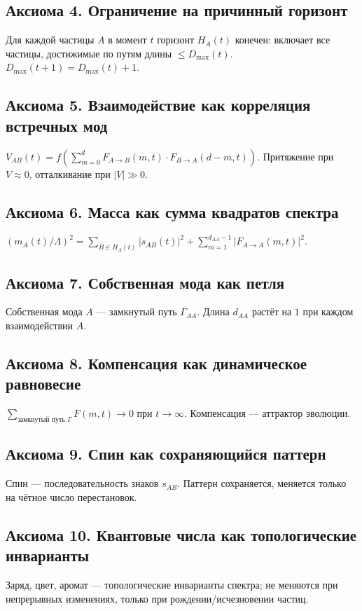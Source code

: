 \documentclass[12pt,a4paper]{article}
\begin{document}
\subsection{Аксиома 4. Ограничение на причинный горизонт}
Для каждой частицы $A$ в момент $t$ горизонт $H_A(t)$ конечен: включает все частицы, достижимые по путям длины $\le D_{\max}(t)$. $D_{\max}(t+1) = D_{\max}(t) + 1$.

\subsection{Аксиома 5. Взаимодействие как корреляция встречных мод}
$V_{AB}(t) = f(\sum_{m=0}^{d} F_{A \to B}(m,t) \cdot F_{B \to A}(d-m,t))$. Притяжение при $V \approx 0$, отталкивание при $|V| \gg 0$.

\subsection{Аксиома 6. Масса как сумма квадратов спектра}
$(m_A(t)/\Lambda)^2 = \sum_{B \in H_A(t)} |s_{AB}(t)|^2 + \sum_{m=1}^{d_{AA}-1} |F_{A \to A}(m,t)|^2$.

\subsection{Аксиома 7. Собственная мода как петля}
Собственная мода $A$ --- замкнутый путь $\Gamma_{AA}$. Длина $d_{AA}$ растёт на $1$ при каждом взаимодействии $A$.

\subsection{Аксиома 8. Компенсация как динамическое равновесие}
$\sum_{\text{замкнутый путь } \Gamma} F(m,t) \to 0$ при $t \to \infty$. Компенсация --- аттрактор эволюции.

\subsection{Аксиома 9. Спин как сохраняющийся паттерн}
Спин --- последовательность знаков $s_{AB}$. Паттерн сохраняется, меняется только на чётное число перестановок.

\subsection{Аксиома 10. Квантовые числа как топологические инварианты}
Заряд, цвет, аромат --- топологические инварианты спектра; не меняются при непрерывных изменениях, только при рождении/исчезновении частиц.
\end{document}
